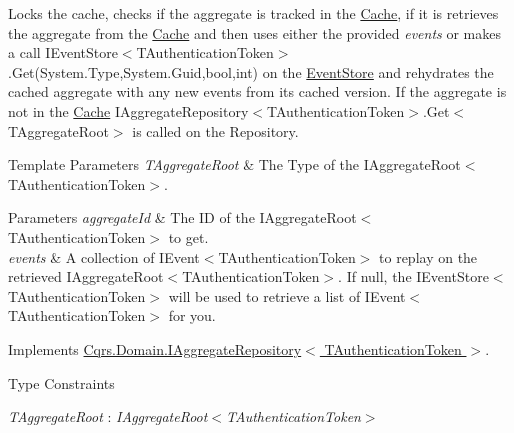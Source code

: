 Locks the cache, checks if the aggregate is tracked in the \hyperlink{namespaceCqrs_1_1Cache}{Cache}, if it is retrieves the aggregate from the \hyperlink{namespaceCqrs_1_1Cache}{Cache} and then uses either the provided {\itshape events}  or makes a call I\+Event\+Store$<$\+T\+Authentication\+Token$>$.\+Get(\+System.\+Type,\+System.\+Guid,bool,int) on the \hyperlink{namespaceCqrs_1_1EventStore}{Event\+Store} and rehydrates the cached aggregate with any new events from it\textquotesingle{}s cached version. If the aggregate is not in the \hyperlink{namespaceCqrs_1_1Cache}{Cache} I\+Aggregate\+Repository$<$\+T\+Authentication\+Token$>$.\+Get$<$\+T\+Aggregate\+Root$>$ is called on the Repository. 


\begin{DoxyTemplParams}{Template Parameters}
{\em T\+Aggregate\+Root} & The Type of the I\+Aggregate\+Root$<$\+T\+Authentication\+Token$>$.\\
\hline
\end{DoxyTemplParams}

\begin{DoxyParams}{Parameters}
{\em aggregate\+Id} & The ID of the I\+Aggregate\+Root$<$\+T\+Authentication\+Token$>$ to get.\\
\hline
{\em events} & A collection of I\+Event$<$\+T\+Authentication\+Token$>$ to replay on the retrieved I\+Aggregate\+Root$<$\+T\+Authentication\+Token$>$. If null, the I\+Event\+Store$<$\+T\+Authentication\+Token$>$ will be used to retrieve a list of I\+Event$<$\+T\+Authentication\+Token$>$ for you. \\
\hline
\end{DoxyParams}


Implements \hyperlink{interfaceCqrs_1_1Domain_1_1IAggregateRepository_a890633fddbd05bd3b9e9968a2de095bb_a890633fddbd05bd3b9e9968a2de095bb}{Cqrs.\+Domain.\+I\+Aggregate\+Repository$<$ T\+Authentication\+Token $>$}.

\begin{Desc}
\item[Type Constraints]\begin{description}
\item[{\em T\+Aggregate\+Root} : {\em I\+Aggregate\+Root$<$T\+Authentication\+Token$>$}]\end{description}
\end{Desc}
\mbox{\label{classCqrs_1_1Cache_1_1CacheRepository_aef9be4db697afa9bd98e264888c389ea_aef9be4db697afa9bd98e264888c389ea}} 
